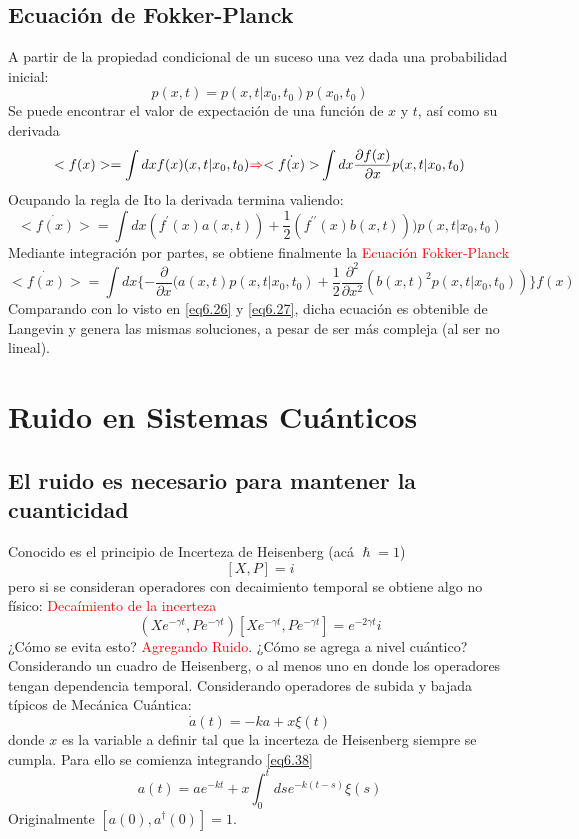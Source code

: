 \documentclass{book}
\begin{document}
\subsection{Ecuación de Fokker-Planck}
A partir de la propiedad condicional de un suceso una vez dada una probabilidad inicial:
\begin{equation}\label{eq6.32}p(x,t)=p(x,t|x_0,t_0)p(x_0,t_0)\end{equation}
Se puede encontrar el valor de expectación de una función de $x$ y $t$, así como su derivada
\begin{equation}\label{eq6.33}<f(x)>=\int dx f(x)(x,t|x_0,t_0) \textcolor{red}{\Rightarrow} \dot{<f(x)>}\int dx \frac{\partial f(x)}{\partial x} p(x,t|x_0,t_0)\end{equation}
Ocupando la regla de Ito la derivada termina valiendo:
\begin{equation}\label{eq6.34}\dot{<f(x)>}=\int dx (f^\prime(x)a(x,t)) +\frac{1}{2}(f^{\prime\prime}(x)b(x,t)))p(x,t|x_0,t_0)\end{equation}
Mediante integración por partes, se obtiene finalmente la \textcolor{red}{Ecuación Fokker-Planck}
\begin{equation}\label{eq6.35}\dot{<f(x)>}=\int dx \{-\frac{\partial}{\partial x}(a(x,t)p(x,t|x_0,t_0)+\frac{1}{2}\frac{\partial^2}{\partial x^2}(b(x,t)^2p(x,t|x_0,t_0))\} f(x)\end{equation}
Comparando con lo visto en \ref{eq6.26} y \ref{eq6.27}, dicha ecuación es obtenible de Langevin y genera las mismas soluciones, a pesar de ser más compleja (al ser no lineal).
\section{Ruido en Sistemas Cuánticos}
\subsection{El ruido es necesario para mantener la cuanticidad}
Conocido es el principio de Incerteza de Heisenberg (acá $\hslash=1$)
\begin{equation}\label{eq6.36}[X,P]=i\end{equation}  pero si se consideran operadores con decaimiento temporal se obtiene algo no físico: \textcolor{red}{Decaímiento de la incerteza}
\begin{equation}\label{eq6.37}(Xe^{-\gamma t}, Pe^{-\gamma t}) [Xe^{-\gamma t}, Pe^{-\gamma t}]=e^{-2\gamma t}i\end{equation}
¿Cómo se evita esto? \textcolor{red}{Agregando Ruido}. ¿Cómo se agrega a nivel cuántico? Considerando un cuadro de Heisenberg, o al menos uno en donde los operadores tengan dependencia temporal. Considerando operadores de subida y bajada típicos de Mecánica Cuántica:
 \begin{equation} \label{eq6.38}\dot{a}(t)=-ka+x\xi(t)\end{equation}
donde $x$ es la variable a definir tal que la incerteza de Heisenberg siempre se cumpla. Para ello se comienza integrando \ref{eq6.38} 
\begin{equation}\label{eq6.39} a(t)=ae^{-kt} +x \int_0^t ds e^{-k(t-s)}\xi(s)\end{equation}
Originalmente $[a(0),a^\dag(0)]=1$. 
\end{document}
